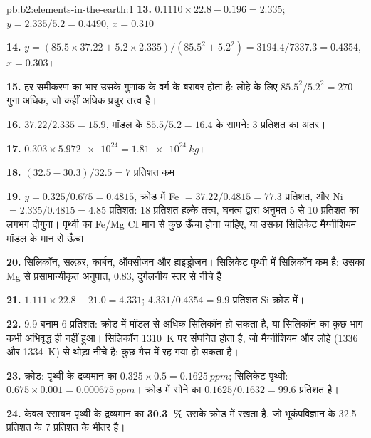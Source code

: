 \begin{solution}{pb:b2:elements-in-the-earth:1}
\textbf{13.} $0.1110\times22.8 - 0.196 = 2.335$; $y = 2.335/5.2 = 0.4490$, $x = 0.310$।

\textbf{14.} $y = (85.5\times37.22 + 5.2\times2.335)/(85.5^2 + 5.2^2) =
3194.4/7337.3 = 0.4354$, $x = 0.303$।

\textbf{15.} हर समीकरण का भार उसके गुणांक के वर्ग के बराबर होता है: लोहे के लिए $85.5^2/5.2^2 = 270$
गुना अधिक, जो कहीं अधिक प्रचुर तत्त्व है।

\textbf{16.} $37.22/2.335 = 15.9$, मॉडल के $85.5/5.2 = 16.4$ के सामने: 3 प्रतिशत
का अंतर।

\textbf{17.} $0.303\times\num{5.972e24} = \qty{1.81e24}{kg}$।

\textbf{18.} $(32.5-30.3)/32.5 = 7$ प्रतिशत कम।

\textbf{19.} $y = 0.325/0.675 = 0.4815$, क्रोड में Fe $= 37.22/0.4815 = 77.3$ प्रतिशत,
और Ni $= 2.335/0.4815 = 4.85$ प्रतिशत: 18 प्रतिशत हल्के तत्त्व, घनत्व द्वारा अनुमत 5 से
10 प्रतिशत का लगभग दोगुना। पृथ्वी का Fe/Mg CI मान से कुछ ऊँचा होना चाहिए,
या उसका सिलिकेट मैग्नीशियम मॉडल के मान से ऊँचा।

\textbf{20.} सिलिकॉन, सल्फ़र, कार्बन, ऑक्सीजन और हाइड्रोजन। सिलिकेट पृथ्वी में सिलिकॉन कम
है: उसका Mg से प्रसामान्यीकृत अनुपात, 0.83, दुर्गलनीय स्तर से नीचे है।

\textbf{21.} $1.111\times22.8 - 21.0 = 4.331$; $4.331/0.4354 = 9.9$ प्रतिशत Si
क्रोड में।

\textbf{22.} 9.9 बनाम 6 प्रतिशत: क्रोड में मॉडल से अधिक सिलिकॉन हो सकता है, या
सिलिकॉन का कुछ भाग कभी अभिवृद्ध ही नहीं हुआ। सिलिकॉन \qty{1310}{K} पर संघनित होता है, जो
मैग्नीशियम और लोहे (1336 और \qty{1334}{K}) से थोड़ा नीचे है: कुछ गैस में रह गया हो सकता है।

\textbf{23.} क्रोड: पृथ्वी के द्रव्यमान का $0.325\times0.5 = \qty{0.1625}{ppm}$; सिलिकेट
पृथ्वी: $0.675\times0.001 = \qty{0.000675}{ppm}$। क्रोड में सोने का
$0.1625/0.1632 = 99.6$ प्रतिशत है।

\textbf{24.} केवल रसायन पृथ्वी के द्रव्यमान का
\textbf{\qty[text-series-to-math=true]{30.3}{\percent}} उसके क्रोड में रखता है,
जो भूकंपविज्ञान के 32.5 प्रतिशत के 7 प्रतिशत के भीतर है।
\end{solution}
